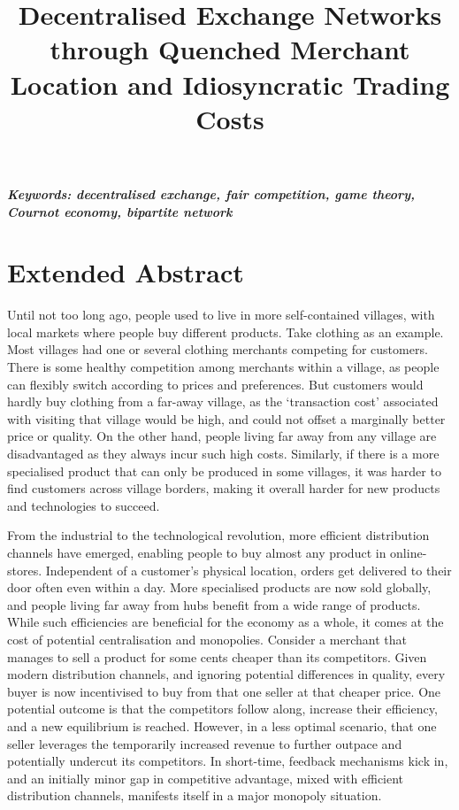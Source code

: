 \documentclass[a4paper,12pt]{article}
\title{Decentralised Exchange Networks through Quenched Merchant Location and Idiosyncratic Trading Costs}
\author[]{} %
\date{}
\begin{document}
\maketitle
\thispagestyle{fancy}

\vspace{-6em}
\begin{center}
\textbf{\textit{Keywords: decentralised exchange, fair competition, game theory, Cournot economy, bipartite network}} 
\newline
\end{center}

\section*{Extended Abstract}

Until not too long ago, people used to live in more self-contained villages, with local markets where people buy different products. 
Take clothing as an example. Most villages had one or several clothing merchants competing for customers. 
There is some healthy competition among merchants within a village, as people can flexibly switch according to prices and preferences.
But customers would hardly buy clothing from a far-away village, as the `transaction cost' associated with visiting that village would be high, 
and could not offset a marginally better price or quality. 
On the other hand, people living far away from any village are disadvantaged as they always incur such high costs.
Similarly, if there is a more specialised product that can only be produced in some villages, it was harder to find customers across village borders, 
making it overall harder for new products and technologies to succeed. 

From the industrial to the technological revolution, more efficient distribution channels have emerged, enabling people to buy almost any product in online-stores. 
Independent of a customer's physical location, orders get delivered to their door often even within a day. 
More specialised products are now sold globally, and people living far away from hubs benefit from a wide range of products. 
While such efficiencies are beneficial for the economy as a whole, it comes at the cost of potential centralisation and monopolies. 
Consider a merchant that manages to sell a product for some cents cheaper than its competitors.
Given modern distribution channels, and ignoring potential differences in quality, every buyer is now incentivised to buy from that one seller at that cheaper price.
One potential outcome is that the competitors follow along, increase their efficiency, and a new equilibrium is reached. 
However, in a less optimal scenario, that one seller leverages the temporarily increased revenue to further outpace and potentially undercut its competitors. 
In short-time, feedback mechanisms kick in, and an initially minor gap in competitive advantage, mixed with efficient distribution channels, manifests itself in a major monopoly situation. 
\end{document}
